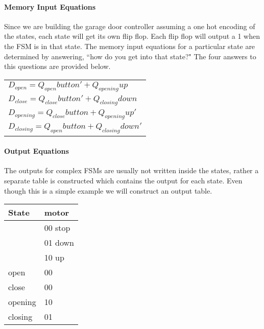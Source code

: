 \begin{enumerate}
\begin{onlysolution}
{                \paragraph{Memory Input Equations}
                Since we are building the garage door controller assuming a
                one hot encoding of the states, each state will get its own
                flip flop.  Each flip flop will output a 1 when the FSM is
                in that state.  The memory input equations for a particular
                state are determined by answering, ``how do you get into that
                state?" The four answers to this questions are provided below.

                \begin{tabular}{l}
                    $D_{open} = Q_{open}button' + Q_{opening}up$ \\
                    $D_{close} = Q_{close}button' + Q_{closing}down$ \\
                    $D_{opening} = Q_{close}button+ Q_{opening}up'$ \\
                    $D_{closing}  = Q_{open}button+ Q_{closing}down'$ \\
                \end{tabular}

                \paragraph{Output Equations}
                The outputs for complex FSMs are usually not written inside the
                states, rather a separate table is constructed which contains the
                output for each state.   Even though this is a simple example
                we will construct an output table.

                \begin{tabular}{l|l}
                    State    & motor        \\ \hline
                    & 00 stop    \\ \hline
                    & 01 down    \\ \hline
                    & 10 up        \\ \hline
                    open    & 00         \\ \hline
                    close   & 00        \\ \hline
                    opening & 10         \\ \hline
                    closing & 01         \\
                \end{tabular}

}
\end{onlysolution}
\end{enumerate}
